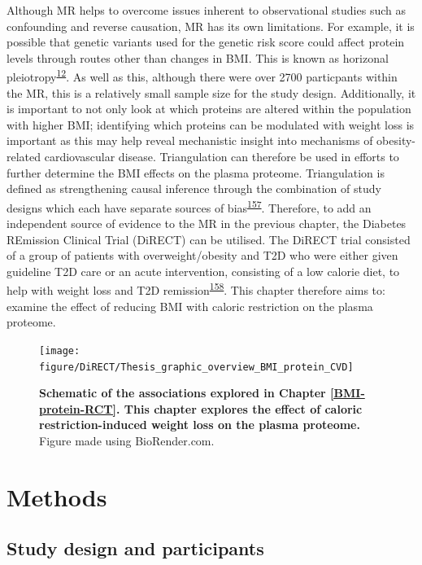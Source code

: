 \documentclass[11pt,twoside]{bristolthesis}
\begin{document}
Although MR helps to overcome issues inherent to observational studies such as confounding and reverse causation, MR has its own limitations. For example, it is possible that genetic variants used for the genetic risk score could affect protein levels through routes other than changes in BMI. This is known as horizonal pleiotropy\textsuperscript{\protect\hyperlink{ref-Davies2018}{12}}. As well as this, although there were over 2700 particpants within the MR, this is a relatively small sample size for the study design. Additionally, it is important to not only look at which proteins are altered within the population with higher BMI; identifying which proteins can be modulated with weight loss is important as this may help reveal mechanistic insight into mechanisms of obesity-related cardiovascular disease. Triangulation can therefore be used in efforts to further determine the BMI effects on the plasma proteome. Triangulation is defined as strengthening causal inference through the combination of study designs which each have separate sources of bias\textsuperscript{\protect\hyperlink{ref-Lawlor2016}{157}}. Therefore, to add an independent source of evidence to the MR in the previous chapter, the Diabetes REmission Clinical Trial (DiRECT) can be utilised. The DiRECT trial consisted of a group of patients with overweight/obesity and T2D who were either given guideline T2D care or an acute intervention, consisting of a low calorie diet, to help with weight loss and T2D remission\textsuperscript{\protect\hyperlink{ref-Lean2018}{158}}. This chapter therefore aims to: examine the effect of reducing BMI with caloric restriction on the plasma proteome.



\begin{figure}
\texttt{[image: figure/DiRECT/Thesis\_graphic\_overview\_BMI\_protein\_CVD]} \caption[Schematic of the associations explored in Chapter \ref{BMI-protein-RCT}]{\textbf{Schematic of the associations explored in Chapter \ref{BMI-protein-RCT}. This chapter explores the effect of caloric restriction-induced weight loss on the plasma proteome.} Figure made using BioRender.com.}\label{fig:BMI-protein-graphic2}
\end{figure}
\hypertarget{methods-3}{%
\section{Methods}\label{methods-3}}

\hypertarget{study-design-and-participants}{%
\subsection{Study design and participants}\label{study-design-and-participants}}
\end{document}
